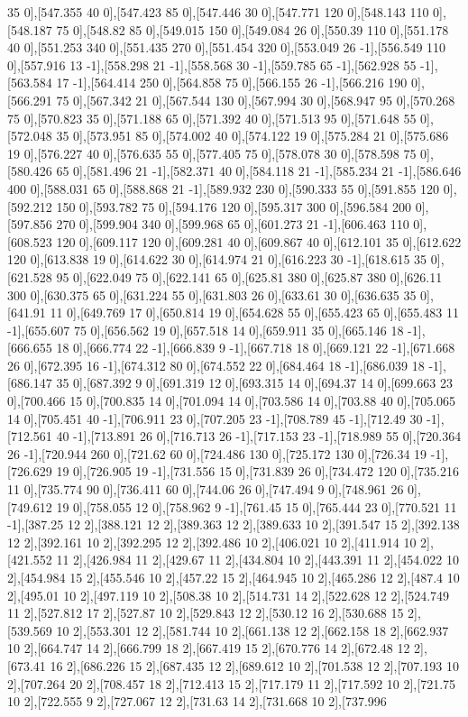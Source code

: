 {35 0],[547.355 40 0],[547.423 85 0],[547.446 30 0],[547.771 120 0],[548.143 110 0],[548.187 75 0],[548.82 85 0],[549.015 150 0],[549.084 26 0],[550.39 110 0],[551.178 40 0],[551.253 340 0],[551.435 270 0],[551.454 320 0],[553.049 26 -1],[556.549 110 0],[557.916 13 -1],[558.298 21 -1],[558.568 30 -1],[559.785 65 -1],[562.928 55 -1],[563.584 17 -1],[564.414 250 0],[564.858 75 0],[566.155 26 -1],[566.216 190 0],[566.291 75 0],[567.342 21 0],[567.544 130 0],[567.994 30 0],[568.947 95 0],[570.268 75 0],[570.823 35 0],[571.188 65 0],[571.392 40 0],[571.513 95 0],[571.648 55 0],[572.048 35 0],[573.951 85 0],[574.002 40 0],[574.122 19 0],[575.284 21 0],[575.686 19 0],[576.227 40 0],[576.635 55 0],[577.405 75 0],[578.078 30 0],[578.598 75 0],[580.426 65 0],[581.496 21 -1],[582.371 40 0],[584.118 21 -1],[585.234 21 -1],[586.646 400 0],[588.031 65 0],[588.868 21 -1],[589.932 230 0],[590.333 55 0],[591.855 120 0],[592.212 150 0],[593.782 75 0],[594.176 120 0],[595.317 300 0],[596.584 200 0],[597.856 270 0],[599.904 340 0],[599.968 65 0],[601.273 21 -1],[606.463 110 0],[608.523 120 0],[609.117 120 0],[609.281 40 0],[609.867 40 0],[612.101 35 0],[612.622 120 0],[613.838 19 0],[614.622 30 0],[614.974 21 0],[616.223 30 -1],[618.615 35 0],[621.528 95 0],[622.049 75 0],[622.141 65 0],[625.81 380 0],[625.87 380 0],[626.11 300 0],[630.375 65 0],[631.224 55 0],[631.803 26 0],[633.61 30 0],[636.635 35 0],[641.91 11 0],[649.769 17 0],[650.814 19 0],[654.628 55 0],[655.423 65 0],[655.483 11 -1],[655.607 75 0],[656.562 19 0],[657.518 14 0],[659.911 35 0],[665.146 18 -1],[666.655 18 0],[666.774 22 -1],[666.839 9 -1],[667.718 18 0],[669.121 22 -1],[671.668 26 0],[672.395 16 -1],[674.312 80 0],[674.552 22 0],[684.464 18 -1],[686.039 18 -1],[686.147 35 0],[687.392 9 0],[691.319 12 0],[693.315 14 0],[694.37 14 0],[699.663 23 0],[700.466 15 0],[700.835 14 0],[701.094 14 0],[703.586 14 0],[703.88 40 0],[705.065 14 0],[705.451 40 -1],[706.911 23 0],[707.205 23 -1],[708.789 45 -1],[712.49 30 -1],[712.561 40 -1],[713.891 26 0],[716.713 26 -1],[717.153 23 -1],[718.989 55 0],[720.364 26 -1],[720.944 260 0],[721.62 60 0],[724.486 130 0],[725.172 130 0],[726.34 19 -1],[726.629 19 0],[726.905 19 -1],[731.556 15 0],[731.839 26 0],[734.472 120 0],[735.216 11 0],[735.774 90 0],[736.411 60 0],[744.06 26 0],[747.494 9 0],[748.961 26 0],[749.612 19 0],[758.055 12 0],[758.962 9 -1],[761.45 15 0],[765.444 23 0],[770.521 11 -1],[387.25 12 2],[388.121 12 2],[389.363 12 2],[389.633 10 2],[391.547 15 2],[392.138 12 2],[392.161 10 2],[392.295 12 2],[392.486 10 2],[406.021 10 2],[411.914 10 2],[421.552 11 2],[426.984 11 2],[429.67 11 2],[434.804 10 2],[443.391 11 2],[454.022 10 2],[454.984 15 2],[455.546 10 2],[457.22 15 2],[464.945 10 2],[465.286 12 2],[487.4 10 2],[495.01 10 2],[497.119 10 2],[508.38 10 2],[514.731 14 2],[522.628 12 2],[524.749 11 2],[527.812 17 2],[527.87 10 2],[529.843 12 2],[530.12 16 2],[530.688 15 2],[539.569 10 2],[553.301 12 2],[581.744 10 2],[661.138 12 2],[662.158 18 2],[662.937 10 2],[664.747 14 2],[666.799 18 2],[667.419 15 2],[670.776 14 2],[672.48 12 2],[673.41 16 2],[686.226 15 2],[687.435 12 2],[689.612 10 2],[701.538 12 2],[707.193 10 2],[707.264 20 2],[708.457 18 2],[712.413 15 2],[717.179 11 2],[717.592 10 2],[721.75 10 2],[722.555 9 2],[727.067 12 2],[731.63 14 2],[731.668 10 2],[737.996 }
